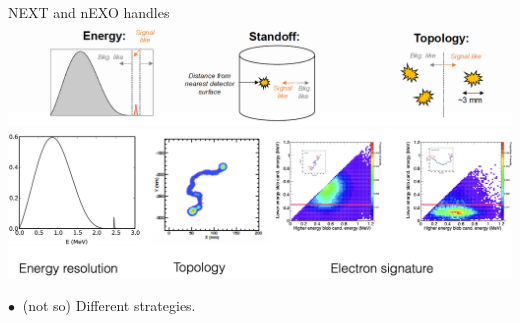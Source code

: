 \documentclass [aspectratio=169]{beamer}
\begin{document}
\begin{frame}{NEXT and nEXO handles}
\includegraphics[scale=0.30]{nexoHandles.png}
\includegraphics[scale=0.30]{nextSignatures.png}

$\bullet~$ (not so) Different strategies.   
\end{frame}



%
%
% 
% 
% 
% 
% 



\end{document}
